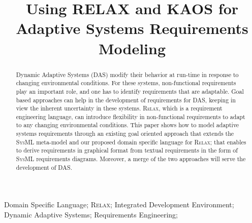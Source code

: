 \documentclass[10pt, conference, compsocconf]{IEEEtran}
\def\myrelax{\textsc{Relax}}                  %
\def\sysml{\textsc{SysML}}
\begin{document}
%
\title{Using RELAX and KAOS for Adaptive Systems Requirements Modeling}



\author{
\and
{}
}

\maketitle

\begin{abstract}
Dynamic Adaptive Systems (DAS) modify their behavior at run-time in response to 
changing environmental conditions. For these systems, non-functional requirements play an 
important role, and one has to identify requirements that are adaptable.  Goal based approaches can help in the development of requirements for DAS, keeping in view the inherent uncertainty in these systems. \myrelax{}, which is a requirement engineering language, can introduce flexibility in 
non-functional requirements to adapt to any changing environmental conditions. 
This paper shows how to model adaptive systems requirements through an existing goal 
oriented approach that extends the \sysml{} meta-model and our proposed domain 
specific language for \myrelax{}; that enables to derive requirements in graphical 
format from textual requirements in the form of \sysml{} requirements diagrams. 
Moreover, a merge of the two approaches will serve the development of DAS.
\end{abstract}

\begin{IEEEkeywords}
Domain Specific Language; \myrelax{}; Integrated Development Environment; Dynamic Adaptive Systems; Requirements Engineering;

\end{IEEEkeywords}
\end{document}
